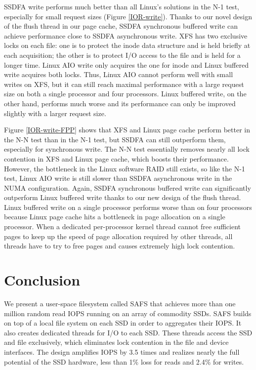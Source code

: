 SSDFA write performs much better than all Linux's solutions in the N-1 test,
especially for small request sizes (Figure \ref{IOR-write}). Thanks to
our novel design of the flush thread in our page cache, SSDFA synchronous
buffered write can achieve performance close to SSDFA asynchronous write.
XFS has two exclusive locks on each file: one is to protect the inode data
structure and is held briefly at each acquisition; the other is
to protect I/O access to the file and is held for a longer time. Linux
AIO write only acquires the one for inode and Linux buffered write acquires
both locks. Thus, Linux AIO cannot perform well with small writes on XFS,
but it can still reach maximal performance with a large request size on both
a single processor and four processors. Linux buffered write, on the other
hand, performs much worse and its performance can only be improved slightly
with a larger request size.

Figure \ref{IOR-write-FPP} shows that XFS and Linux page cache perform
better in the N-N test than in the N-1 test, but SSDFA can still outperform them,
especially
for synchronous write. The N-N test essentially removes nearly all lock
contention in XFS and Linux page cache, which boosts their performance.
However, the bottleneck in the Linux software RAID still exists, so like
the N-1 test, Linux AIO write is still slower than SSDFA asynchronous
write in the NUMA configuration. Again, SSDFA synchronous buffered write
can significantly outperform Linux buffered write thanks to our new design
of the flush thread. Linux buffered write on a single processor
performs worse than on four processors because Linux page cache hits
a bottleneck in page allocation on a single processor. When a dedicated
per-processor kernel thread cannot free sufficient pages to keep
up the speed of page allocation required by other threads, all threads
have to try to free pages and causes extremely high lock contention.

\section{Conclusion}
We present a user-space filesystem called SAFS that achieves more than one million
random read IOPS running on an array of commodity SSDs. SAFS builds on top of 
a local file system on each SSD in order to aggregates their IOPS.
It also creates dedicated threads for I/O to each SSD.  These threads
access the SSD and file exclusively, which eliminates lock contention 
in the file and device interfaces.
The design amplifies IOPS by 3.5 times and realizes nearly the 
full potential of the SSD hardware, less than 1\% loss for reads
and 2.4\% for writes.

